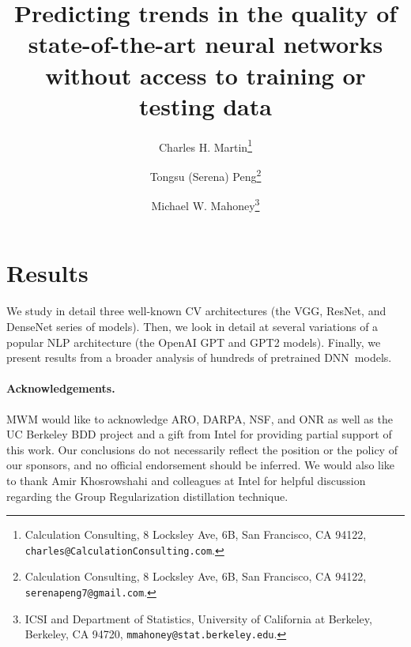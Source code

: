\documentclass[11pt]{article}
\begin{document}
\title{%
Predicting trends in the quality of state-of-the-art neural networks without access to training or testing data
}

\author{%
Charles H. Martin\thanks{Calculation Consulting, 8 Locksley Ave, 6B, San Francisco, CA 94122, \texttt{charles@CalculationConsulting.com}.} 
\and 
Tongsu (Serena) Peng\thanks{Calculation Consulting, 8 Locksley Ave, 6B, San Francisco, CA 94122, \texttt{serenapeng7@gmail.com}.}
\and
Michael W. Mahoney\thanks{ICSI and Department of Statistics, University of California at Berkeley, Berkeley, CA 94720, \texttt{mmahoney@stat.berkeley.edu}.}
}

\date{}
\maketitle



\begin{abstract}

\end{abstract}





\section{Results}
We study in detail three well-known CV architectures (the VGG, ResNet, and DenseNet series of models).
Then, we look in detail at several variations of a popular NLP architecture (the OpenAI GPT and GPT2 models).
Finally, we present results from a broader analysis of hundreds of pretrained DNN~models.









\noindent
\paragraph{Acknowledgements.}
MWM would like to acknowledge ARO, DARPA, NSF, and ONR as well as the UC Berkeley BDD project and a gift from Intel for providing partial support of this work.
Our conclusions do not necessarily reflect the position or the policy of our sponsors, and no official endorsement should be inferred.
We would also like to thank Amir Khosrowshahi and colleagues at Intel for helpful discussion regarding the Group Regularization distillation technique.


%
{\small
%

%
}

\appendix

\end{document}

